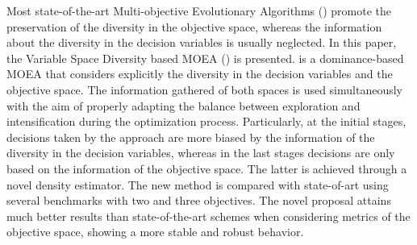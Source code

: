 Most state-of-the-art Multi-objective Evolutionary Algorithms (\MOEAS{}) promote the preservation of the diversity 
in the objective space, whereas the information about the diversity in the decision variables is usually neglected.
%
In this paper, the Variable Space Diversity based MOEA (\VSDMOEA{}) is presented.
%
\VSDMOEA{} is a dominance-based MOEA that considers explicitly the diversity in the decision variables and the objective space.
%
The information gathered of both spaces is used simultaneously with the aim of properly adapting the balance between exploration
and intensification during the optimization process.
%
Particularly, at the initial stages, decisions taken by the approach are more biased by the information of the diversity in 
the decision variables, whereas in the last stages decisions are only based on the information of the objective space.
%
The latter is achieved through a novel density estimator.
%
The new method is compared with state-of-art \MOEAS{} using several benchmarks with two and three objectives.
%
The novel proposal attains much better results than state-of-the-art schemes when considering metrics of the objective space, 
showing a more stable and robust behavior.
